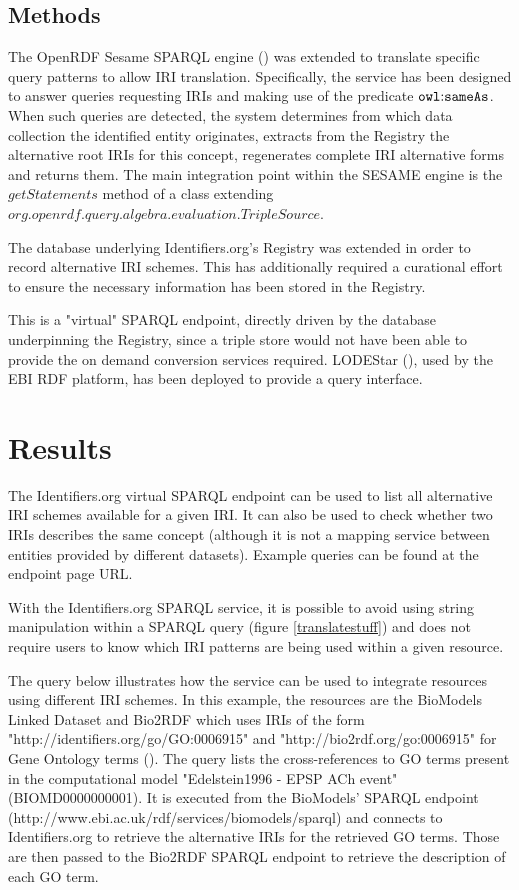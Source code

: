 \documentclass{bioinfo}
\begin{document}
\begin{methods}
\section{Methods}
The OpenRDF Sesame SPARQL engine (\cite{SESAME}) was extended to translate specific query patterns to allow IRI translation. Specifically, the service has been designed to answer queries requesting IRIs and making use of the predicate $\mathtt{owl\text{\rm :}{}sameAs}$. When such queries are detected, the system determines from which data collection the identified entity originates, extracts from the Registry the alternative root IRIs for this concept, regenerates complete IRI alternative forms and returns them. The main integration point within the SESAME engine is the $getStatements$ method of a class extending $org.openrdf.query.algebra.evaluation.TripleSource$.

The database underlying Identifiers.org's Registry was extended in order to record alternative IRI schemes. This has additionally required a curational effort to ensure the necessary information has been stored in the Registry.

This is a "virtual" SPARQL endpoint, directly driven by the database underpinning the Registry, since a triple store would not have been able to provide the on demand conversion services required. LODEStar (\cite{LODEStar}), used by the EBI RDF platform, has been deployed to provide a query interface.
\end{methods}

\section{Results}
The Identifiers.org virtual SPARQL endpoint can be used to list all alternative IRI schemes available for a given IRI. It can also be used to check whether two IRIs describes the same concept (although it is not a mapping service between entities provided by different datasets). Example queries can be found at the endpoint page URL.

With the Identifiers.org SPARQL service, it is possible to avoid using string manipulation within a SPARQL query (figure \ref{translatestuff}) and does not require users to know which IRI patterns are being used within a given resource.

The query below illustrates how the service can be used to integrate resources using different IRI schemes. In this example, the resources are the BioModels Linked Dataset and Bio2RDF which uses IRIs of the form "http://identifiers.org/go/GO:0006915" and "http://bio2rdf.org/go:0006915" for Gene Ontology terms (\cite{Ashburner2000}). The query lists the cross-references to GO terms present in the computational model "Edelstein1996 - EPSP ACh event" (BIOMD0000000001). It is executed from the BioModels' SPARQL endpoint (http://www.ebi.ac.uk/rdf/services/biomodels/sparql) and connects to Identifiers.org to retrieve the alternative IRIs for the retrieved GO terms. Those are then passed to the Bio2RDF SPARQL endpoint to retrieve the description of each GO term.
\end{document}
